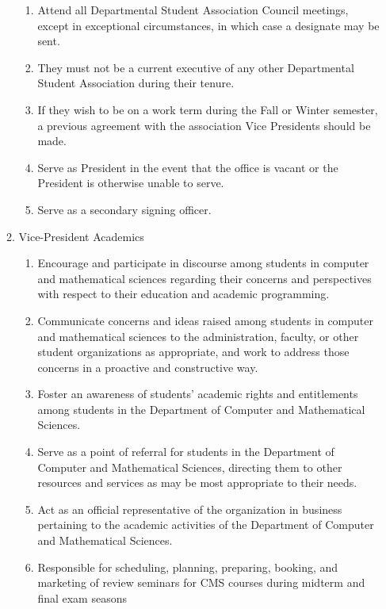 \documentclass[12pt,a4paper]{article}
\begin{document}
\begin{enumerate}
\begin{enumerate}
\begin{enumerate}
\item Attend all Departmental Student Association Council meetings, except in exceptional circumstances, in which case a designate may be sent.

\item They must not be a current executive of any other Departmental Student Association during their tenure.

\item If they wish to be on a work term during the Fall or Winter semester, a previous agreement with the association Vice Presidents should be made.

\item Serve as President in the event that the office is vacant or the President is otherwise unable to serve.

\item Serve as a secondary signing officer.
\end{enumerate}

\item Vice-President Academics

\begin{enumerate}
\item Encourage and participate in discourse among students in computer and mathematical sciences regarding their concerns and perspectives with respect to their education and academic programming.

\item Communicate concerns and ideas raised among students in computer and mathematical sciences to the administration, faculty, or other student organizations as appropriate, and work to address those concerns in a proactive and constructive way.

\item Foster an awareness of students' academic rights and entitlements among students in the Department of Computer and Mathematical Sciences.

\item Serve as a point of referral for students in the Department of Computer and Mathematical Sciences, directing them to other resources and services as may be most appropriate to their needs.

\item Act as an official representative of the organization in business pertaining to the academic activities of the Department of Computer and Mathematical Sciences.

\item Responsible for scheduling, planning, preparing, booking, and marketing of review seminars for CMS courses during midterm and final exam seasons


\end{enumerate}
\end{enumerate}
\end{enumerate}
\end{document}
